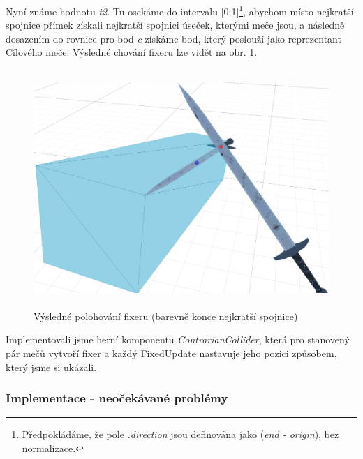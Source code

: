 Nyní známe hodnotu \textit{t2}. Tu osekáme do intervalu [0;1]\footnote{Předpokládáme, že pole \textit{.direction} jsou definována jako (\textit{end - origin}), bez normalizace.}, abychom místo nejkratší spojnice přímek získali nejkratší spojnici úseček, kterými meče jsou, a následně dosazením do rovnice pro bod \textit{c} získáme bod, který poslouží jako reprezentant Cílového meče. Výsledné chování fixeru lze vidět na obr. \ref{obr05:fixerPositioning}.


\begin{figure}[ht]\centering
  \center
  \includegraphics[height=90mm]{../img/collisionFix-show1.png}
  \caption{Výsledné polohování fixeru (barevně konce nejkratší spojnice)}
  \label{obr05:fixerPositioning}
\end{figure} 

Implementovali jsme herní komponentu \textit{ContrarianCollider}, která pro stanovený pár mečů vytvoří fixer a každý FixedUpdate nastavuje jeho pozici způsobem, který jsme si ukázali.


\subsubsection*{Implementace - neočekávané problémy}

